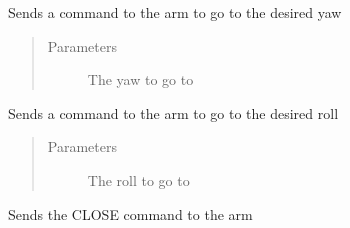 \documentclass[letterpaper,10pt,english,openany,oneside]{sphinxmanual}
\begin{document}
\begin{fulllineitems}
\begin{fulllineitems}
\label{\detokenize{src/serialarmcontroller:SerialArmController.SerialArmController.set_yaw}}
Sends a command to the arm to go to the desired yaw
\begin{quote}\begin{description}
\item[{Parameters}] \leavevmode
{} \textendash{} The yaw to go to

\end{description}\end{quote}

\end{fulllineitems}


\begin{fulllineitems}
\label{\detokenize{src/serialarmcontroller:SerialArmController.SerialArmController.set_roll}}
Sends a command to the arm to go to the desired roll
\begin{quote}\begin{description}
\item[{Parameters}] \leavevmode
{} \textendash{} The roll to go to

\end{description}\end{quote}

\end{fulllineitems}


\begin{fulllineitems}
\label{\detokenize{src/serialarmcontroller:SerialArmController.SerialArmController.close_arm}}
Sends the CLOSE command to the arm

\end{fulllineitems}



\end{fulllineitems}
\end{document}
